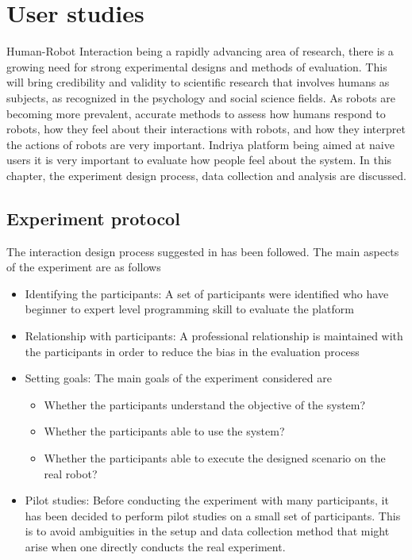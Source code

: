 
\chapter{User studies} %

\label{Chapter6} %

Human-Robot Interaction being a rapidly advancing area of research, there is a growing need for strong experimental designs and methods of evaluation. This will bring credibility and validity to scientific research that involves humans as subjects, as recognized in the psychology and social science fields. As robots are becoming more prevalent, accurate methods to assess how humans respond to robots, how they feel about their interactions with robots, and how they interpret the actions of robots are very important. Indriya platform being aimed at naive users it is very important to evaluate how people feel about the system. In this chapter, the experiment design process, data collection and analysis are discussed.

\section{Experiment protocol}
The interaction design process suggested in \cite{Rogers2011} has been followed. The main aspects of the experiment are as follows
\begin{itemize}
\item Identifying the participants: A set of participants were identified who have beginner to expert level programming skill to evaluate the platform
\item Relationship with participants: A professional relationship is maintained with the participants in order to reduce the bias in the evaluation process
\item Setting goals: The main goals of the experiment considered are
\begin{itemize}
\item Whether the participants understand the objective of the system?
\item Whether the participants able to use the system?
\item Whether the participants able to execute the designed scenario on the real robot?
\end{itemize}
\item Pilot studies: Before conducting the experiment with many participants, it has been decided to perform pilot studies on a small set of participants. This is to avoid ambiguities in the setup and data collection method that might arise when one directly conducts the real experiment.
\end{itemize}

